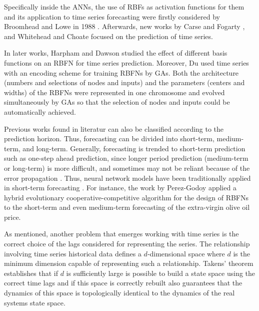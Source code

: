\documentclass[preprint,authoryear,12pt]{elsarticle}
\begin{document}

Specifically inside the ANNs, the use of RBFs as activation functions for them and its application to time series forecasting were firstly considered by Broomhead and Lowe in 1988 \cite{Broomhead88}. Afterwards, new works by Carse and Fogarty \cite{Carse1996}, and Whitehead and Choate \cite{Whitehead96} focused on the prediction of time series.

In later works, Harpham and Dawson \cite{Harpham06} studied the effect of different basis functions on an RBFN for time series prediction. Moreover, Du \cite{Du2008} used time series with an encoding scheme for training RBFNs by GAs. Both the architecture (numbers and selections of nodes and inputs) and the parameters (centers and widths) of the RBFNs were represented in one chromosome and evolved simultaneously by GAs so that the selection of nodes and inputs could be automatically achieved.

Previous works found in literatur can also be classified according to the prediction horizon. Thus, forecasting can be divided into short-term, medium-term, and long-term. Generally, forecasting is trended to short-term prediction such as one-step ahead prediction, since longer period prediction (medium-term or long-term) is more difficult, and sometimes may not be reliant because of the error propagation \cite{Chatterjee06}. Thus, neural network models have been traditionally applied in short-term forecasting \cite{Hippert10,Lee09}. For instance, the work by Perez-Godoy \cite{PerezGodoy2010} applied a hybrid evolutionary cooperative-competitive algorithm for the design of RBFNs to the short-term and even medium-term forecasting of the extra-virgin olive oil price.


As mentioned, another problem that emerges working with time series is the correct choice of the lags considered for representing the series. The relationship involving time series historical data defines a $d$-dimensional space where $d$ is the minimum dimension capable of representing such a relationship. Takens' theorem \cite{Takens1980} establishes that if $d$ is sufficiently large is possible to build a state space using the correct time lags and if this space is correctly rebuilt also guarantees that the dynamics of this space is topologically identical to the dynamics of the real systems state space. %
\end{document}
